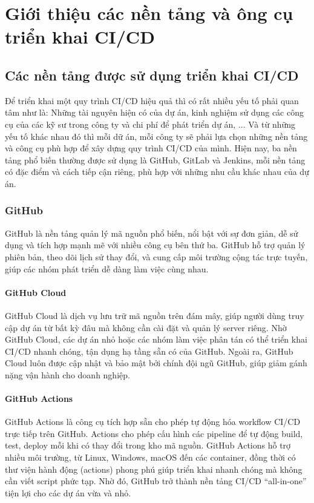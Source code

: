 \chapter{Giới thiệu các nền tảng và ông cụ triển khai CI/CD}


\section{Các nền tảng được sử dụng triển khai CI/CD}

Để triển khai một quy trình CI/CD hiệu quả thì có rất nhiều yếu tố phải quan tâm như là: Những tài nguyên hiện có của dự án, kinh nghiệm sử dụng các công cụ của các kỹ sư trong công ty và chi phí để phát triển dự án, ... Và từ những yếu tố khác nhau đó thì mỗi dữ án, mỗi công ty sẽ phải lựa chọn những nền tảng và công cụ phù hợp để xây dựng quy trình CI/CD của mình. Hiện nay, ba nền tảng phổ biến thường được sử dụng là GitHub, GitLab và Jenkins, mỗi nền tảng có đặc điểm và cách tiếp cận riêng, phù hợp với những nhu cầu khác nhau của dự án. 

\subsection{GitHub}

GitHub là nền tảng quản lý mã nguồn phổ biến, nổi bật với sự đơn giản, dễ sử dụng và tích hợp mạnh mẽ với nhiều công cụ bên thứ ba. GitHub hỗ trợ quản lý phiên bản, theo dõi lịch sử thay đổi, và cung cấp môi trường cộng tác trực tuyến, giúp các nhóm phát triển dễ dàng làm việc cùng nhau.

\subsubsection{GitHub Cloud}
GitHub Cloud là dịch vụ lưu trữ mã nguồn trên đám mây, giúp người dùng truy cập dự án từ bất kỳ đâu mà không cần cài đặt và quản lý server riêng. Nhờ GitHub Cloud, các dự án nhỏ hoặc các nhóm làm việc phân tán có thể triển khai CI/CD nhanh chóng, tận dụng hạ tầng sẵn có của GitHub. Ngoài ra, GitHub Cloud luôn được cập nhật và bảo mật bởi chính đội ngũ GitHub, giúp giảm gánh nặng vận hành cho doanh nghiệp.

\subsubsection{GitHub Actions}
GitHub Actions là công cụ tích hợp sẵn cho phép tự động hóa workflow CI/CD trực tiếp trên GitHub. Actions cho phép cấu hình các pipeline để tự động build, test, deploy mỗi khi có thay đổi trong kho mã nguồn. GitHub Actions hỗ trợ nhiều môi trường, từ Linux, Windows, macOS đến các container, đồng thời có thư viện hành động (actions) phong phú giúp triển khai nhanh chóng mà không cần viết script phức tạp. Nhờ đó, GitHub trở thành nền tảng CI/CD “all-in-one” tiện lợi cho các dự án vừa và nhỏ.

